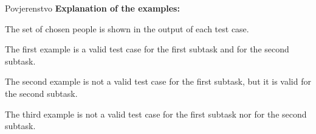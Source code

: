 \begin{statement}[
  problempoints=100,
  timelimit=3 seconds,
  memorylimit=512 MiB,
]{Povjerenstvo}
\textbf{Explanation of the examples:}

The set of chosen people is shown in the output of each test case.

The first example is a valid test case for the first subtask and for the second subtask.

The second example is not a valid test case for the first subtask, but it is valid for the second subtask.

The third example is not a valid test case for the first subtask nor for the second subtask.

\end{statement}

